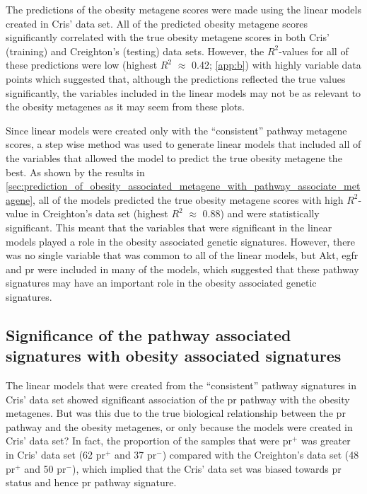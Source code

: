 The predictions of the obesity metagene scores were made using the linear models created in Cris' data set.
All of the predicted obesity metagene scores significantly correlated with the true obesity metagene scores in both Cris' (training) and Creighton's (testing) data sets.
However, the $R^2$-values for all of these predictions were low (highest $R^2$ $\approx$ 0.42; \cref{app:b}) with highly variable data points which suggested that, although the predictions reflected the true values significantly, the variables included in the linear models may not be as relevant to the obesity metagenes as it may seem from these plots.

Since linear models were created only with the ``consistent'' pathway metagene scores, a step wise method was used to generate linear models that included all of the variables that allowed the model to predict the true obesity metagene the best.
As shown by the results in \cref{sec:prediction_of_obesity_associated_metagene_with_pathway_associate_metagene}, all of the models predicted the true obesity metagene scores with high $R^2$-value in Creighton's data set (highest $R^2$ $\approx$ 0.88) and were statistically significant.
This meant that the variables that were significant in the linear models played a role in the obesity associated genetic signatures.
However, there was no single variable that was common to all of the linear models, but Akt, \gls{egfr} and \gls{pr} were included in many of the models, which suggested that these pathway signatures may have an important role in the obesity associated genetic signatures.

\subsection{Significance of the pathway associated signatures with obesity associated signatures}
\label{sub:significance_of_pr_pathway}


The linear models that were created from the ``consistent'' pathway signatures in Cris' data set showed significant association of the \gls{pr} pathway with the obesity metagenes.
But was this due to the true biological relationship between the \gls{pr} pathway and the obesity metagenes, or only because the models were created in Cris' data set?
In fact, the proportion of the samples that were \gls{pr}$^+$ was greater in Cris' data set (62 \gls{pr}$^+$ and 37 \gls{pr}$^-$) compared with the Creighton's data set (48 \gls{pr}$^+$ and 50 \gls{pr}$^-$), which implied that the Cris' data set was biased towards \gls{pr} status and hence \gls{pr} pathway signature.

